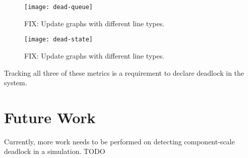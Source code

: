 \documentclass{article}
\begin{document}
\begin{figure}[H]
	\texttt{[image: dead-queue]}\newline
	\centering
	\caption{\color{red} FIX: Update graphs with different line types.}
	\centering
\end{figure}

\begin{figure}[H]
	\texttt{[image: dead-state]}\newline
	\centering
	\caption{\color{red} FIX: Update graphs with different line types.}
	\centering
\end{figure}

Tracking all three of these metrics is a requirement to declare deadlock in the system. 




\section{Future Work}
Currently, more work needs to be performed on detecting component-scale deadlock in a simulation.
TODO



\end{document}

